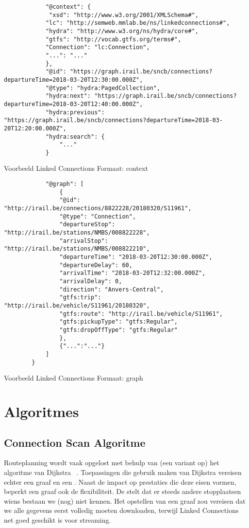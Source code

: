 \begin{code}[h]
	\begin{verbatim}
			"@context": {
			 "xsd": "http://www.w3.org/2001/XMLSchema#",
			"lc": "http://semweb.mmlab.be/ns/linkedconnections#",
			"hydra": "http://www.w3.org/ns/hydra/core#",
			"gtfs": "http://vocab.gtfs.org/terms#",
			"Connection": "lc:Connection",
			"...": "..."
			},
			"@id": "https://graph.irail.be/sncb/connections?departureTime=2018-03-20T12:30:00.000Z",
			"@type": "hydra:PagedCollection",
			"hydra:next": "https://graph.irail.be/sncb/connections?departureTime=2018-03-20T12:40:00.000Z",
			"hydra:previous": "https://graph.irail.be/sncb/connections?departureTime=2018-03-20T12:20:00.000Z",
			"hydra:search": {
				"..."
			}
		\end{verbatim}
	\caption{Voorbeeld Linked Connections Formaat: context}
	\label{code:2:linkedconnections-response-context}
\end{code}
\begin{code}[h]
	\begin{verbatim}
			"@graph": [
				{
				"@id": "http://irail.be/connections/8822228/20180320/S11961",
				"@type": "Connection",
				"departureStop": "http://irail.be/stations/NMBS/008822228",
				"arrivalStop": "http://irail.be/stations/NMBS/008822210",
				"departureTime": "2018-03-20T12:30:00.000Z",
				"departureDelay": 60,
				"arrivalTime": "2018-03-20T12:32:00.000Z",
				"arrivalDelay": 0,
				"direction": "Anvers-Central",
				"gtfs:trip": "http://irail.be/vehicle/S11961/20180320",
				"gtfs:route": "http://irail.be/vehicle/S11961",
				"gtfs:pickupType": "gtfs:Regular",
				"gtfs:dropOffType": "gtfs:Regular"
				},
				{"...":"..."}
			]
		}
	\end{verbatim}
\caption{Voorbeeld Linked Connections Formaat: graph}
\label{code:2:linkedconnections-response-graph}
\end{code}
\section{Algoritmes}
\label{sec:algoritmes}
\subsection{Connection Scan Algoritme}
\label{sec:csa}
Routeplanning wordt vaak opgelost met behulp van (een variant op) het algoritme van Dijkstra ~\citep{strasser13,hannemann07,hannemann08}. Toepassingen die gebruik maken van Dijkstra vereisen echter een graaf en een . Naast de impact op prestaties die deze eisen vormen, beperkt een graaf ook de flexibiliteit. De  stelt dat er steeds andere stopplaatsen wiens bestaan we (nog) niet kennen. Het opstellen van een graaf zou vereisen dat we alle gegevens eerst volledig moeten downloaden, terwijl Linked Connections net goed geschikt is voor streaming. 

